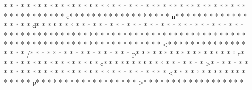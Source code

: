 * * *  * * *  * * *  *  * * *  *  * * *  * 	* * *  * * *  * * *  *  * * *  *  * * *  * 	* * *  * * *  * * *  *  * * *  *  * * *  * e* * *  * * *  * * *  *  * * *  *  * * *  * n* * *  * * *  * * *  *  * * *  *  * * *  * d* * *  * * *  * * *  *  * * *  *  * * *  * {* * *  * * *  * * *  *  * * *  *  * * *  *  * * *  * * *  * * *  *  * * *  *  * * *  * }* * *  * * *  * * *  *  * * *  *  * * *  * 
* * *  * * *  * * *  *  * * *  *  * * *  * 	* * *  * * *  * * *  *  * * *  *  * * *  * <* * *  * * *  * * *  *  * * *  *  * * *  * /* * *  * * *  * * *  *  * * *  *  * * *  * p* * *  * * *  * * *  *  * * *  *  * * *  * r* * *  * * *  * * *  *  * * *  *  * * *  * e* * *  * * *  * * *  *  * * *  *  * * *  * >* * *  * * *  * * *  *  * * *  *  * * *  * 
* * *  * * *  * * *  *  * * *  *  * * *  * <* * *  * * *  * * *  *  * * *  *  * * *  * p* * *  * * *  * * *  *  * * *  *  * * *  * >* * *  * * *  * * *  *  * * *  *  * * *  * 
